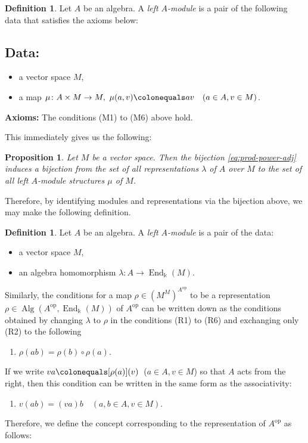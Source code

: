 \documentclass{surv-l}
\numberwithin{equation}{chapter}
\numberwithin{figure}{chapter}
\theoremstyle{plain}
\newtheorem{prp}[thm]{Proposition}
\theoremstyle{definition}
\newtheorem{dfn}[thm]{Definition}
\theoremstyle{remark}
\DeclareMathOperator{\End}{End}
\DeclareMathOperator{\Alg}{Alg}
\begin{document}
\begin{dfn}
Let $A$ be an algebra.
A \emph{left $A$-module} is a pair of the following data that satisfies
the axioms below:

\subsection*{Data:}
\begin{itemize}
\item
a vector space $M$,
\item
a map $\mu \colon A \times M \to M,\ \mu(a,v)\colonequals  av \quad (a \in A, v \in M)$.
\end{itemize}
{\bf Axioms:}
The conditions (M1) to (M6) above hold.
\end{dfn}

This immediately gives us the following:

\begin{prp}\label{prp:rep=mod}
Let $M$ be a vector space.
Then the bijection \eqref{eq:prod-power-adj} induces a bijection
from the set of all representations $\lambda$ of $A$ over $M$
to the set of all left $A$-module structures $\mu$ of $M$.
\end{prp}

Therefore, by identifying modules and representations via the bijection above, we may make the following definition.

\begin{dfn}
Let $A$ be an algebra.
A \emph{left $A$-module} is a pair of the data:
\begin{itemize}
\item
a vector space $M$,
\item
an algebra homomorphism $\lambda\colon A \to \End_{\Bbbk}(M)$.
\end{itemize}
\end{dfn}

Similarly,
the conditions for a map $\rho \in (M^M)^{A^{\mathrm{op}}}$ to be a representation
$\rho \in \Alg(A^{\mathrm{op}}, \End_\Bbbk(M))$ of $A^{\mathrm{op}}$ can be written down as
the conditions obtained by changing $\lambda$ to $\rho$ in the conditions (R1) to (R6)
and exchanging only (R2) to the following
\begin{enumerate}
\item[(R$2'$)]
$\rho(ab) = \rho(b) \circ \rho(a)$.
\end{enumerate}
If we write
$va\colonequals  [\rho(a)](v)$\ ($a \in A, v \in M$)
so that $A$ acts from the right,
then this condition can be written in the same form as the associativity:
\begin{enumerate}
\item[(M$2'$)]
$v(ab) = (va)b \quad (a,b \in A, v \in M)$.
\end{enumerate}
Therefore, we define the concept corresponding to the representation of $A^{\mathrm{op}}$ as follows:
\end{document}
